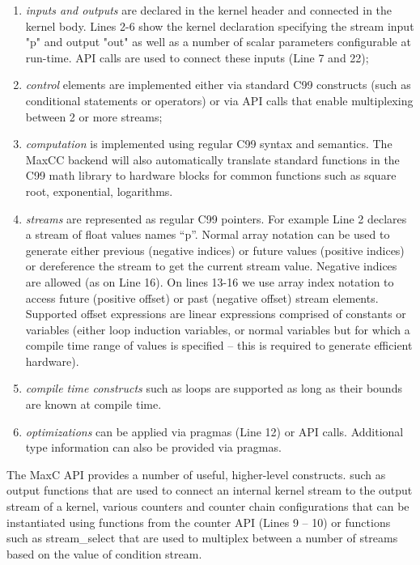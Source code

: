 \begin{enumerate}
\item \emph{inputs and outputs} are declared in the kernel header and
  connected in the kernel body. Lines 2-6 show the kernel declaration
  specifying the stream input "p" and output "out" as well as a number
  of scalar parameters configurable at run-time. API calls are used to
  connect these inputs (Line 7 and 22);

\item \emph{control} elements are implemented either via standard C99
  constructs (such as conditional statements or operators) or via API
  calls that enable multiplexing between 2 or more streams;

\item \emph{computation} is implemented using regular C99 syntax and
  semantics. The MaxCC backend will also automatically translate
  standard functions in the C99 math library to hardware blocks for
  common functions such as square root, exponential, logarithms.

\item \emph{streams} are represented as regular C99 pointers. For
  example Line 2 declares a stream of float values names ``p''.
  Normal array notation can be used to generate either previous
  (negative indices) or future values (positive indices) or
  dereference the stream to get the current stream value. Negative
  indices are allowed (as on Line 16). On lines 13-16 we use array
  index notation to access future (positive offset) or past (negative
  offset) stream elements. Supported offset expressions are linear
  expressions comprised of constants or variables (either loop
  induction variables, or normal variables but for which a compile
  time range of values is specified -- this is required to generate
  efficient hardware).

\item \emph{compile time constructs} such as loops are supported as
  long as their bounds are known at compile time.

\item \emph{optimizations} can be applied via pragmas (Line 12) or API
  calls. Additional type information can also be provided via pragmas.

\end{enumerate}

The MaxC API provides a number of useful, higher-level constructs.
such as output functions that are used to connect an internal kernel
stream to the output stream of a kernel, various counters and counter
chain configurations that can be instantiated using functions from the
counter API (Lines 9 -- 10) or functions such as stream\_select that
are used to multiplex between a number of streams based on the value
of condition stream.



